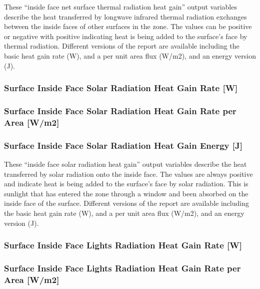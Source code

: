 These ``inside face net surface thermal radiation heat gain'' output variables describe the heat transferred by longwave infrared thermal radiation exchanges between the inside faces of other surfaces in the zone. The values can be positive or negative with positive indicating heat is being added to the surface's face by thermal radiation. Different versions of the report are available including the basic heat gain rate (W), and a per unit area flux (W/m2), and an energy version (J).

\subsubsection{Surface Inside Face Solar Radiation Heat Gain Rate {[}W{]}}\label{surface-inside-face-solar-radiation-heat-gain-rate-w}

\subsubsection{Surface Inside Face Solar Radiation Heat Gain Rate per Area {[}W/m2{]}}\label{surface-inside-face-solar-radiation-heat-gain-rate-per-area-wm2}

\subsubsection{Surface Inside Face Solar Radiation Heat Gain Energy {[}J{]}}\label{surface-inside-face-solar-radiation-heat-gain-energy-j}

These ``inside face solar radiation heat gain'' output variables describe the heat transferred by solar radiation onto the inside face. The values are always positive and indicate heat is being added to the surface's face by solar radiation. This is sunlight that has entered the zone through a window and been absorbed on the inside face of the surface. Different versions of the report are available including the basic heat gain rate (W), and a per unit area flux (W/m2), and an energy version (J).

\subsubsection{Surface Inside Face Lights Radiation Heat Gain Rate {[}W{]}}\label{surface-inside-face-lights-radiation-heat-gain-rate-w}

\subsubsection{Surface Inside Face Lights Radiation Heat Gain Rate per Area {[}W/m2{]}}\label{surface-inside-face-lights-radiation-heat-gain-rate-per-area-wm2}

